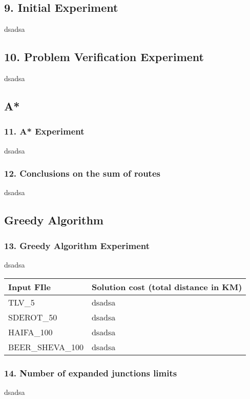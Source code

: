\documentclass{article}
\begin{document}
\subsection*{9. Initial Experiment}
dsadsa

\subsection*{10. Problem Verification Experiment}
dsadsa

\subsection*{A*}
\subsubsection*{11. A* Experiment}
dsadsa

\subsubsection*{12. Conclusions on the sum of routes}
dsadsa

\subsection*{Greedy Algorithm}
\subsubsection*{13. Greedy Algorithm Experiment}
dsadsa
\begin{table}[!h!p]
\begin{center}
\begin{tabular}{l l}
\hline
\textbf{Input FIle} & \textbf{Solution cost (total distance in KM)} \\ \hline
TLV\_5 & dsadsa \\ \hline
SDEROT\_50 & dsadsa \\ \hline
HAIFA\_100 & dsadsa \\ \hline
BEER\_SHEVA\_100 & dsadsa \\ 
\hline\hline
\end{tabular}
\end{center}
\end{table}

\subsubsection*{14. Number of expanded junctions limits}
dsadsa
\end{document}
